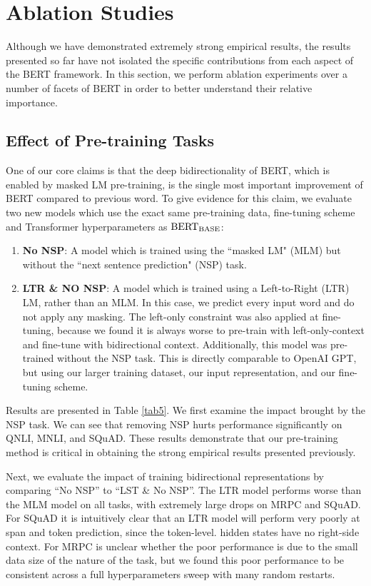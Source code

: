 
\section{Ablation Studies} \label{sec5}
Although we have demonstrated extremely strong empirical results, the results presented so far have not isolated the specific contributions from each aspect of the BERT framework. In this section, we perform ablation experiments over a number of facets of BERT in order to better understand their relative importance.

	\subsection{Effect of Pre-training Tasks} \label{sec5.1}
	One of our core claims is that the deep bidirectionality of BERT, which is enabled by masked LM pre-training, is the single most important improvement of BERT compared to previous word. To give evidence for this claim, we evaluate two new models which use the exact same pre-training data, fine-tuning scheme and Transformer hyperparameters as $\rm BERT_{BASE}$:
	
		\begin{enumerate}
			\item \textbf{No NSP}: A model which is trained using the ``masked LM" (MLM) but without the ``next sentence prediction" (NSP) task.
			\item \textbf{LTR \& NO NSP}: A model which is trained using a Left-to-Right (LTR) LM, rather than an MLM. In this case, we predict every input word and do not apply any masking. The left-only constraint was also applied at fine-tuning, because we found it is always worse to pre-train with left-only-context and fine-tune with bidirectional context. Additionally, this model was pre-trained without the NSP task. This is directly comparable to OpenAI GPT, but using our larger training dataset, our input representation, and our fine-tuning scheme.
		\end{enumerate}
	
	Results are presented in Table \ref{tab5}. We first examine the impact brought by the NSP task. We can see that removing NSP hurts performance significantly on QNLI, MNLI, and SQuAD. These results demonstrate that our pre-training method is critical in obtaining the strong empirical results presented previously.
	
	Next, we evaluate the impact of training bidirectional representations by comparing ``No NSP'' to ``LST \& No NSP''. The LTR model performs worse than the MLM model on all tasks, with extremely large drops on MRPC and SQuAD. For SQuAD it is intuitively clear that an LTR model will perform very poorly at span and token prediction, since the token-level. hidden states have no right-side context. For MRPC is unclear whether the poor performance is due to the small data size of the nature of the task, but we found this poor performance to be consistent across a full hyperparameters sweep with many random restarts. 
	
